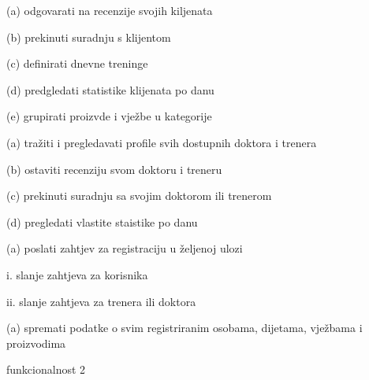 \begin{packed_enum}
				\begin{packed_enum}
					
					\item (a) odgovarati na recenzije svojih kiljenata
					\item (b) prekinuti suradnju s klijentom
					\item (c) definirati dnevne treninge
					\item (d) predgledati statistike klijenata po danu
					\item (e) grupirati proizvde i vježbe u kategorije
					
				\end{packed_enum}
			
				\item  {}
				
				\begin{packed_enum}
					
					\item (a) tražiti i pregledavati profile svih dostupnih doktora i trenera
					\item (b) ostaviti recenziju svom doktoru i treneru
					\item (c) prekinuti suradnju sa svojim doktorom ili trenerom
					\item (d) pregledati vlastite staistike po danu
					
				\end{packed_enum}
			
				\item  {}
				
				\begin{packed_enum}
					
					\item (a) poslati zahtjev za registraciju u željenoj ulozi
					
					\begin{packed_enum}
						
						\item i. slanje zahtjeva za korisnika 
						\item ii. slanje zahtjeva za trenera ili doktora
						
					\end{packed_enum}
					
				\end{packed_enum}
			
				\item  \underbar{Baza podataka može:}
				
				\begin{packed_enum}
					
					\item (a) spremati podatke o svim registriranim osobama, dijetama, vježbama i proizvodima
					\item funkcionalnost 2
					
				\end{packed_enum}
			
			\end{packed_enum}
			
